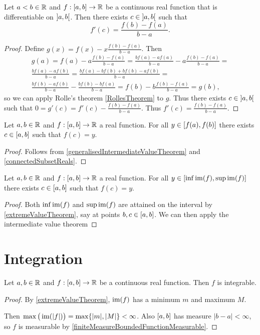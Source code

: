 \begin{theorem} \label{meanValueTheorem}
Let $a<b\in \mathbb{R}$ and $f: \interval{a,b}\to \R$ be a continuous real function that is differentiable on $\interval[o]{a,b}$. Then there exists $c\in \interval[o]{a,b}$ such that
\[f'(c) = \frac{f(b)-f(a)}{b-a}. \]
\end{theorem}
\begin{proof}
Define $g(x) = f(x) - x\frac{f(b)-f(a)}{b-a}$. Then
\begin{multline*}
g(a) = f(a) - a\frac{f(b)-f(a)}{b-a} = \frac{bf(a) - af(a)}{b-a} - a\frac{f(b)-f(a)}{b-a} = \\ \frac{bf(a)-af(b)}{b-a} = \frac{bf(a)-bf(b) + bf(b)-af(b)}{b-a} = \\ \frac{bf(b) - af(b)}{b-a} - \frac{bf(b) - bf(a)}{b-a} = f(b) - b \frac{f(b)-f(a)}{b-a} = g(b),
\end{multline*}
so we can apply Rolle's theorem \ref{RollesTheorem} to $g$. Thus there exists $c\in \interval[o]{a,b}$ such that $0 = g'(c) = f'(c) - \frac{f(b)-f(a)}{b-a}$. Thus $f'(c) = \frac{f(b)-f(a)}{b-a}$.
\end{proof}

\begin{proposition}
Let $a,b\in \mathbb{R}$ and $f:\interval{a,b}\to \R$ a real function. For all $y\in \interval{f(a), f(b)}$ there exists $c\in \interval{a,b}$ such that $f(c) = y$.
\end{proposition}
\begin{proof}
Follows from \ref{generalisedIntermediateValueTheorem} and \ref{connectedSubsetReals}.
\end{proof}
\begin{corollary} \label{extremaIntermediateValueTheorem}
Let $a,b\in \mathbb{R}$ and $f:\interval{a,b}\to \R$ a real function. For all $y\in \interval{\inf\im(f), \sup\im(f)}$ there exists $c\in \interval{a,b}$ such that $f(c) = y$.
\end{corollary}
\begin{proof}
Both $\inf\operatorname{im}(f)$ and $\sup\operatorname{im}(f)$ are attained on the interval by \ref{extremeValueTheorem}, say at points $b,c\in \interval{a,b}$. We can then apply the intermediate value theorem 
\end{proof}

\section{Integration}
\begin{lemma} \label{continuousRealFunctionIntegrable}
Let $a,b\in \mathbb{R}$ and $f:\interval{a,b}\to \R$ be a continuous real function. Then $f$ is integrable.
\end{lemma}
\begin{proof}
By \ref{extremeValueTheorem}, $\operatorname{im}(f)$ has a minimum $m$ and maximum $M$.

Then $\max\big(\operatorname{im}(|f|)\big) = \max\{|m|, |M|\}<\infty$. Also $\interval{a,b}$ has measure $|b-a|<\infty$, so $f$ is measurable by \ref{finiteMeasureBoundedFunctionMeasurable}.
\end{proof}

